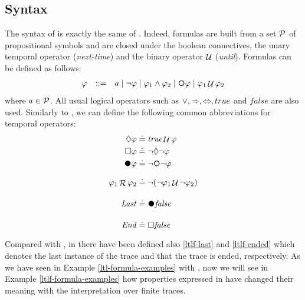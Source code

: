 \subsection{Syntax}\label{ltlf-syntax}
The syntax of \LTLf is exactly the same of \LTL. Indeed, \LTLf formulas are built from a set $\P$ of propositional symbols and are closed under the boolean connectives, the unary temporal operator \Next (\emph{next-time}) and the binary operator $\lUntil$ (\emph{until}). Formulas can be defined as follows:
\[\begin{array}{rcl}
\varphi &::=& a \mid \lnot \varphi \mid \varphi_1\land \varphi_2 \mid \Next\varphi \mid \varphi_1 \lUntil \varphi_2
\end{array}
\]
where $a\in \P$. All usual logical operators such as $\lOR, \Rightarrow, \Leftrightarrow, true$ and $false$ are also used. Similarly to \LTL, we can define the following common abbreviations for temporal operators:
\begin{align}
\Diamond\varphi &\doteq \true\lUntil\varphi \label{ltlf-eve}\\
\Box\varphi &\doteq\lnot\Diamond\lnot\varphi \label{ltlf-alw}\\
\Wnext \varphi &\doteq \lnot \Next \lnot \varphi \label{ltlf-wn}\\
\varphi_1 \Release \varphi_2 &\doteq \lnot (\lnot \varphi_1 \lUntil \lnot \varphi_2) \label{ltlf-release}\\
\Last &\doteq \Wnext\false \label{ltlf-last}\\
\Ended &\doteq \Box\false \label{ltlf-ended}
\end{align}
Compared with \LTL, in \LTLf there have been defined also \ref{ltlf-last} and \ref{ltlf-ended} which denotes the last instance of the trace and that the trace is ended, respectively.
As we have seen in Example \ref{ltl-formula-examples} with \LTL, now we will see in Example \ref{ltlf-formula-examples} how properties expressed in \LTLf have changed their meaning with the interpretation over finite traces.
